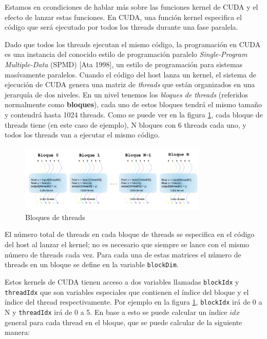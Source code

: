 Estamos en ccondiciones de hablar más sobre las funciones kernel de CUDA y el efecto de lanzar estas funciones. En CUDA,
una función kernel especifica el código que será ejecutado por todos los threads durante una fase paralela.

Dado que todos los threads ejecutan el mismo código, la programación en CUDA es una instancia del conocido estilo de
programación paralelo \textit{Single-Program Multiple-Data} (SPMD) [Ata 1998], un estilo de programación para sistemas
masívamente paralelos. Cuando el código del host lanza un kernel, el sistema de ejecución de CUDA genera una matriz de
\textit{threads} que están organizados en una jerarquía de dos niveles. En un nivel tenemos los \textit{bloques de
threads} (referidos normalmente como \textbf{bloques}), cada uno de estos bloques tendrá el mismo tamaño y contendrá
hasta 1024 threads. Como se puede ver en la figura \ref{fig:thread_blocks}, cada bloque de threads tiene (en este caso
de ejemplo), N bloques con 6 threads cada uno, y todos los threads van a ejecutar el mismo código.

\begin{figure}[H]
  \centering
  \includegraphics[width=0.8\textwidth]{images/thread_in_grid.png}
  \caption{Bloques de threads}
  \label{fig:thread_blocks}
\end{figure}

El número total de threads en cada bloque de threads se especifica en el código del host al lanzar el kernel; no es
necesario que siempre se lance con el mismo número de threads cada vez. Para cada una de estas matrices el número de
threads en un bloque se define en la variable \texttt{blockDim}.

Estos kernels de CUDA tienen acceso a dos variables llamadas \texttt{blockIdx} y \texttt{threadIdx} que son variables
especiales que contienen el índice del bloque y el índice del thread respectivamente. Por ejemplo en la figura
\ref{fig:thread_blocks}, \texttt{blockIdx} irá de 0 a N y \texttt{threadIdx} irá de 0 a 5. En base a esto se puede
calcular un índice $idx$ general para cada thread en el bloque, que se puede calcular de la siguiente manera:


